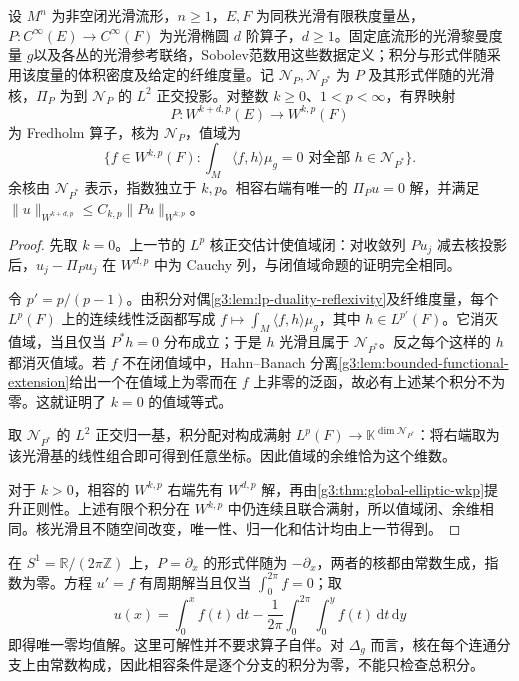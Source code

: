 \begin{theorem}\label{g3:thm:elliptic-fredholm-wkp}
	设 \(M^n\) 为非空闭光滑流形，\(n\ge1\)，\(E,F\) 为同秩光滑有限秩度量丛，\(P:C^\infty(E)\to C^\infty(F)\) 为光滑椭圆 \(d\) 阶算子，\(d\ge1\)。固定底流形的光滑黎曼度量 \(g\)以及各丛的光滑参考联络，Sobolev范数用这些数据定义；积分与形式伴随采用该度量的体积密度及给定的纤维度量。记 \(\mathcal N_P,\mathcal N_{P^*}\) 为 \(P\) 及其形式伴随的光滑核，\(\Pi_P\) 为到 \(\mathcal N_P\) 的 \(L^2\) 正交投影。对整数 \(k\ge0\)、\(1<p<\infty\)，有界映射
	\[
		P:W^{k+d,p}(E)\longrightarrow W^{k,p}(F)
	\]
	为 Fredholm 算子，核为 \(\mathcal N_P\)，值域为
	\[
		\{f\in W^{k,p}(F):\textstyle\int_M\langle f,h\rangle\mu_g=0
		\text{ 对全部 }h\in\mathcal N_{P^*}\}.
	\]
	余核由 \(\mathcal N_{P^*}\) 表示，指数独立于 \(k,p\)。相容右端有唯一的 \(\Pi_Pu=0\) 解，并满足 \(\|u\|_{W^{k+d,p}}\le C_{k,p}\|Pu\|_{W^{k,p}}\)。
\end{theorem}
\begin{proof}
	先取 \(k=0\)。上一节的 \(L^p\) 核正交估计使值域闭：对收敛列 \(Pu_j\) 减去核投影后，\(u_j-\Pi_Pu_j\) 在 \(W^{d,p}\) 中为 Cauchy 列，与闭值域命题的证明完全相同。

	令 \(p'=p/(p-1)\)。由积分对偶\cref{g3:lem:lp-duality-reflexivity}及纤维度量，每个 \(L^p(F)\) 上的连续线性泛函都写成
	\(f\mapsto\int_M\langle f,h\rangle\mu_g\)，其中 \(h\in L^{p'}(F)\)。它消灭值域，当且仅当 \(P^*h=0\) 分布成立；于是 \(h\) 光滑且属于 \(\mathcal N_{P^*}\)。反之每个这样的 \(h\) 都消灭值域。若 \(f\) 不在闭值域中，Hahn--Banach 分离\cref{g3:lem:bounded-functional-extension}给出一个在值域上为零而在 \(f\) 上非零的泛函，故必有上述某个积分不为零。这就证明了 \(k=0\) 的值域等式。

	取 \(\mathcal N_{P^*}\) 的 \(L^2\) 正交归一基，积分配对构成满射 \(L^p(F)\to\mathbb K^{\dim\mathcal N_{P^*}}\)：将右端取为该光滑基的线性组合即可得到任意坐标。因此值域的余维恰为这个维数。

	对于 \(k>0\)，相容的 \(W^{k,p}\) 右端先有 \(W^{d,p}\) 解，再由\cref{g3:thm:global-elliptic-wkp}提升正则性。上述有限个积分在 \(W^{k,p}\) 中仍连续且联合满射，所以值域闭、余维相同。核光滑且不随空间改变，唯一性、归一化和估计均由上一节得到。
\end{proof}

\begin{example}\label{g3:exm:circle-fredholm-compatibility}
	在 \(S^1=\mathbb R/(2\pi\mathbb Z)\) 上，\(P=\partial_x\) 的形式伴随为 \(-\partial_x\)，两者的核都由常数生成，指数为零。方程 \(u'=f\) 有周期解当且仅当 \(\int_0^{2\pi}f=0\)；取
	\[
		u(x)=\int_0^x f(t)\,\mathrm dt-
		\frac1{2\pi}\int_0^{2\pi}\int_0^y f(t)\,\mathrm dt\,\mathrm dy
	\]
	即得唯一零均值解。这里可解性并不要求算子自伴。对 \(\Delta_g\) 而言，核在每个连通分支上由常数构成，因此相容条件是逐个分支的积分为零，不能只检查总积分。
\end{example}

